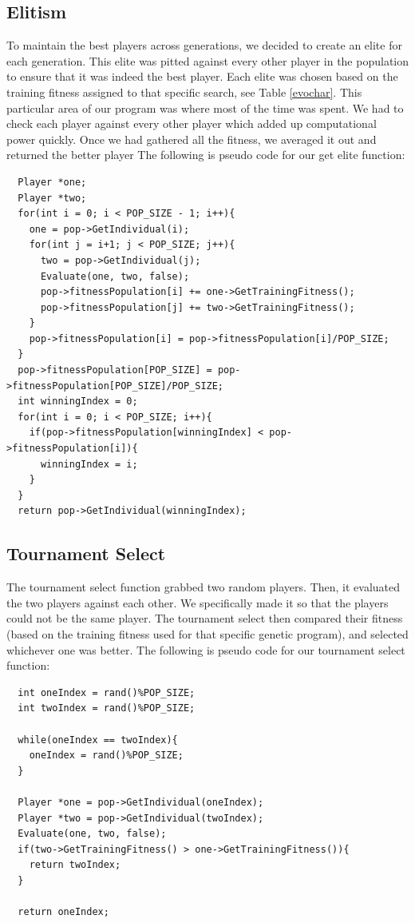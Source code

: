 \documentclass{acm_proc_article-sp}
\begin{document}
\subsection{Elitism}
To maintain the best players across generations, we decided to create an elite for each generation. This elite was pitted against every other player in the population to ensure that it was indeed the best player. Each elite was chosen based on the training fitness assigned to that specific search, see Table \ref{evochar}. This particular area of our program was where most of the time was spent. We had to check each player against every other player which added up computational power quickly. Once we had gathered all the fitness, we averaged it out and returned the better player The following is pseudo code for our get elite function:
\begin{lstlisting}
  Player *one;
  Player *two;
  for(int i = 0; i < POP_SIZE - 1; i++){
    one = pop->GetIndividual(i);
    for(int j = i+1; j < POP_SIZE; j++){
      two = pop->GetIndividual(j);
      Evaluate(one, two, false);
      pop->fitnessPopulation[i] += one->GetTrainingFitness();
      pop->fitnessPopulation[j] += two->GetTrainingFitness();
    }
    pop->fitnessPopulation[i] = pop->fitnessPopulation[i]/POP_SIZE;
  }
  pop->fitnessPopulation[POP_SIZE] = pop->fitnessPopulation[POP_SIZE]/POP_SIZE;
  int winningIndex = 0;
  for(int i = 0; i < POP_SIZE; i++){
    if(pop->fitnessPopulation[winningIndex] < pop->fitnessPopulation[i]){
      winningIndex = i;
    }
  }
  return pop->GetIndividual(winningIndex);
\end{lstlisting}

\subsection{Tournament Select}
The tournament select function grabbed two random players. Then, it evaluated the two players against each other. We specifically made it so that the players could not be the same player. The tournament select then compared their fitness (based on the training fitness used for that specific genetic program), and selected whichever one was better. The following is pseudo code for our tournament select function:
\begin{lstlisting}
  int oneIndex = rand()%POP_SIZE;
  int twoIndex = rand()%POP_SIZE;

  while(oneIndex == twoIndex){
    oneIndex = rand()%POP_SIZE;
  }

  Player *one = pop->GetIndividual(oneIndex);
  Player *two = pop->GetIndividual(twoIndex);
  Evaluate(one, two, false);
  if(two->GetTrainingFitness() > one->GetTrainingFitness()){
    return twoIndex;
  }

  return oneIndex;
\end{lstlisting}
\end{document}
